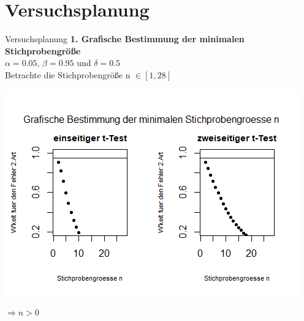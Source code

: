 \documentclass[ ngerman, fontsize= 10pt, headings=big, titlepage=true]{beamer}
\begin{document}
\section{Versuchsplanung}
\begin{frame}{Versuchsplanung}
	\textbf{1. Grafische Bestimmung der minimalen Stichprobengröße}\\
	$\alpha =0.05$, $\beta = 0.95$ und $\delta =0.5$\\
	 Betrachte die Stichprobengröße n $\in [1,28]$
	 
	\begin{center}
		\includegraphics[scale=0.5]{Stichprobengröße1.png}
	\end{center}

	$\Rightarrow n > 0$
\end{frame}
\end{document}
